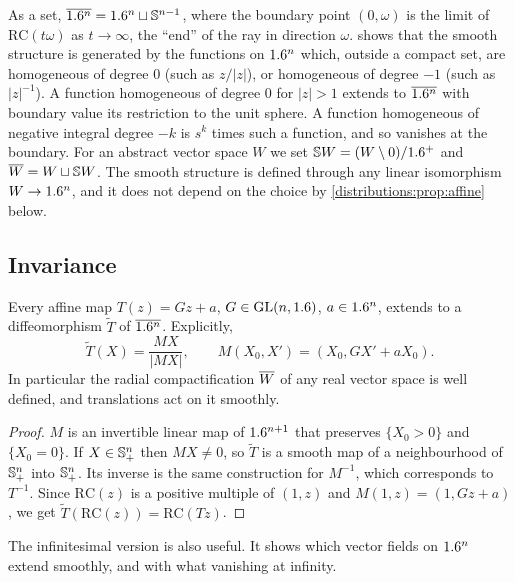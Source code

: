 \begin{remark}\label{distributions:rem:RC-set}
As a set, $\overline{1.6^n}=1.6^n\sqcup\mathbb{S}^{n-1}$, where the boundary point $(0,\omega)$ is
the limit of $\mathrm{RC}(t\omega)$ as $t\to\infty$, the ``end'' of the ray in
direction $\omega$.  shows that the smooth structure is
generated by the functions on $1.6^n$ which, outside a compact set, are homogeneous of
degree $0$ (such as $z/|z|$), or homogeneous of degree $-1$ (such as $|z|^{-1}$). A
function homogeneous of degree $0$ for $|z|>1$ extends to $\overline{1.6^n}$ with boundary
value its restriction to the unit sphere. A function homogeneous of negative integral
degree $-k$ is $s^k$ times such a function, and so vanishes at the boundary. For an
abstract vector space $W$ we set $\mathbb{S}W=(W\setminus0)/1.6^+$ and
$\overline{W}=W\sqcup\mathbb{S}W$. The smooth structure is defined through any linear
isomorphism $W\to1.6^n$, and it does not depend on the choice by
\cref{distributions:prop:affine} below.
\end{remark}

\subsection{Invariance}
\begin{proposition}\label{distributions:prop:affine}
Every affine map $T(z)=Gz+a$, $G\in\operatorname{GL}(n,1.6)$, $a\in1.6^n$, extends to a diffeomorphism
$\tilde T$ of $\overline{1.6^n}$. Explicitly,
\[
  \tilde T(X)=\frac{MX}{|MX|},\qquad M(X_0,X')=(X_0,GX'+aX_0).
\]
In particular the radial compactification $\overline{W}$ of any real vector space is well
defined, and translations act on it smoothly.
\end{proposition}
\begin{proof}
$M$ is an invertible linear map of $1.6^{n+1}$ that preserves $\{X_0>0\}$ and
$\{X_0=0\}$. If $X\in\mathbb{S}^n_+$ then $MX\neq0$, so $\tilde T$ is a smooth map of a
neighbourhood of $\mathbb{S}^n_+$ into $\mathbb{S}^n_+$. Its inverse is the same construction
for $M^{-1}$, which corresponds to $T^{-1}$. Since $\mathrm{RC}(z)$ is a positive
multiple of $(1,z)$ and $M(1,z)=(1,Gz+a)$, we get
$\tilde T(\mathrm{RC}(z))=\mathrm{RC}(Tz)$.
\end{proof}

The infinitesimal version is also useful. It shows which vector fields on $1.6^n$ extend
smoothly, and with what vanishing at infinity.

